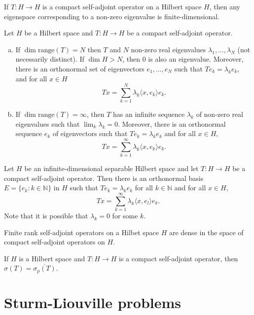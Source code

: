 \documentclass[a4paper]{article}
\newcommand{\N}{\mathbb{N}}
\newcommand{\<}{\langle}
\renewcommand{\>}{\rangle}
\newcommand{\la}{\lambda}
\newcommand{\s}{\sigma}
\newcommand{\range}{\mathrm{range}}
\begin{document}
\begin{prop}
  If $T:H\to H$ is a compact self-adjoint operator on a Hilbert space $H$, then any eigenspace corresponding to a non-zero eigenvalue is finite-dimensional.
\end{prop}

\begin{thm}
  Let $H$ be a Hilbert space and $T:H\to H$ be a compact self-adjoint operator.
  \begin{enumerate}[(a)]
    \item If $\dim\range(T)=N$ then $T$ and $N$ non-zero real eigenvalues $\la_1,\ldots,\la_N$ (not necessarily distinct). If $\dim H>N$, then $0$ is also an eigenvalue. Moreover, there is an orthonormal set of eigenvectors $e_1,\ldots,e_N$ such that $Te_k=\la_k e_k$, and for all $x\in H$
      $$ Tx = \sum_{k=1}^N\la_k\<x,e_k\>e_k.$$
    \item If $\dim\range(T)=\infty$, then $T$ has an infinite sequence $\la_k$ of non-zero real eigenvalues such that $\lim_k\la_k=0$. Moreover, there is an orthonormal sequence $e_k$ of eigenvectors such that $Te_k=\la_ke_k$ and for all $x\in H$,
      $$Tx = \sum_{k=1}^\infty \la_k\<x,e_k\>e_k.$$
  \end{enumerate}
\end{thm}

\begin{prop}
  Let $H$ be an infinite-dimensional separable Hilbert space and let $T:H\to H$ be a compact self-adjoint operator. Then there is an orthonormal basis $E=\{e_k:k\in\N\}$ in $H$ such that $Te_k=\la_ke_k$ for all $k\in\N$ and for all $x\in H$,
  $$Tx  =\sum_{k=1}^\infty\la_k\<x,e_l\>e_k.$$
  Note that it is possible that $\la_k=0$ for some $k$.
\end{prop}

\begin{prop}
  Finite rank self-adjoint operators on a Hilbet space $H$ are dense in the space of compact self-adjoint operators on $H$.
\end{prop}

\begin{thm}
  If $H$ is a Hilbert space and $T:H\to H$ is a compact self-adjoint operator, then $\s(T)=\overline{\s_p(T)}$.
\end{thm}

\section{Sturm-Liouville problems}
\end{document}
